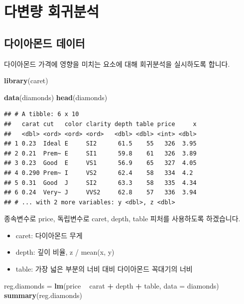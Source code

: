 \documentclass[12pt,]{book}
\newenvironment{Shaded}{\begin{snugshade}}{\end{snugshade}}
\newcommand{\DataTypeTok}[1]{\textcolor[rgb]{0.13,0.29,0.53}{#1}}
\newcommand{\KeywordTok}[1]{\textcolor[rgb]{0.13,0.29,0.53}{\textbf{#1}}}
\newcommand{\NormalTok}[1]{#1}
\newcommand{\OperatorTok}[1]{\textcolor[rgb]{0.81,0.36,0.00}{\textbf{#1}}}
\newcommand{\StringTok}[1]{\textcolor[rgb]{0.31,0.60,0.02}{#1}}
\providecommand{\tightlist}{%
  \setlength{\itemsep}{0pt}\setlength{\parskip}{0pt}}
\begin{document}
\hypertarget{uxb2e4uxbcc0uxb7c9-uxd68cuxadc0uxbd84uxc11d}{%
\section{다변량 회귀분석}\label{uxb2e4uxbcc0uxb7c9-uxd68cuxadc0uxbd84uxc11d}}

\hypertarget{uxb2e4uxc774uxc544uxbaacuxb4dc-uxb370uxc774uxd130}{%
\subsection{다이아몬드 데이터}\label{uxb2e4uxc774uxc544uxbaacuxb4dc-uxb370uxc774uxd130}}

다이아몬드 가격에 영향을 미치는 요소에 대해 회귀분석을 실시하도록 합니다.

\begin{Shaded}
\begin{Highlighting}[]
\KeywordTok{library}\NormalTok{(caret)}

\KeywordTok{data}\NormalTok{(diamonds)}
\KeywordTok{head}\NormalTok{(diamonds)}
\end{Highlighting}
\end{Shaded}

\begin{verbatim}
## # A tibble: 6 x 10
##   carat cut   color clarity depth table price     x
##   <dbl> <ord> <ord> <ord>   <dbl> <dbl> <int> <dbl>
## 1 0.23  Ideal E     SI2      61.5    55   326  3.95
## 2 0.21  Prem~ E     SI1      59.8    61   326  3.89
## 3 0.23  Good  E     VS1      56.9    65   327  4.05
## 4 0.290 Prem~ I     VS2      62.4    58   334  4.2 
## 5 0.31  Good  J     SI2      63.3    58   335  4.34
## 6 0.24  Very~ J     VVS2     62.8    57   336  3.94
## # ... with 2 more variables: y <dbl>, z <dbl>
\end{verbatim}

종속변수로 price, 독립변수로 caret, depth, table 피처를 사용하도록 하겠습니다.

\begin{itemize}
\tightlist
\item
  caret: 다이아몬드 무게
\item
  depth: 깊이 비율, z / mean(x, y)
\item
  table: 가장 넓은 부분의 너비 대비 다이아몬드 꼭대기의 너비
\end{itemize}

\begin{Shaded}
\begin{Highlighting}[]
\NormalTok{reg.diamonds =}\StringTok{ }\KeywordTok{lm}\NormalTok{(price }\OperatorTok{~}\StringTok{ }\NormalTok{carat }\OperatorTok{+}\StringTok{ }\NormalTok{depth }\OperatorTok{+}\StringTok{ }\NormalTok{table, }\DataTypeTok{data =}\NormalTok{ diamonds)}
\KeywordTok{summary}\NormalTok{(reg.diamonds)}
\end{Highlighting}
\end{Shaded}
\end{document}
